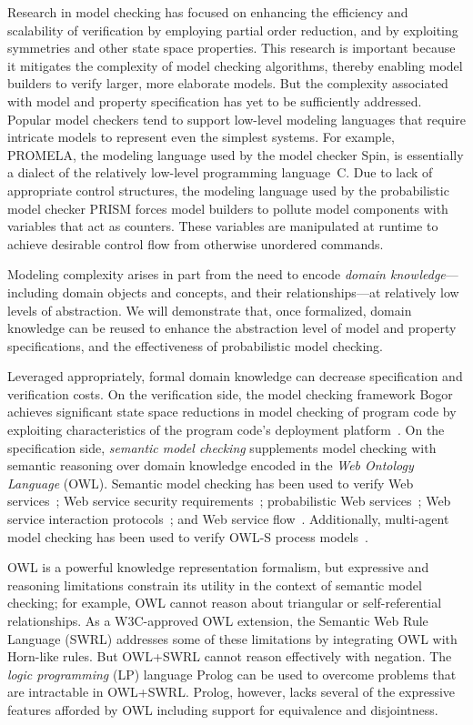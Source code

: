 Research in model checking has focused on enhancing the efficiency and scalability of verification by employing partial order reduction, and by exploiting symmetries and other state space properties. This research is important because it mitigates the complexity of model checking algorithms, thereby enabling model builders to verify larger, more elaborate models. But the complexity associated with model and property specification has yet to be sufficiently addressed. Popular model checkers tend to support low-level modeling languages that require intricate models to represent even the simplest systems. For example, PROMELA, the modeling language used by the model checker Spin, is essentially a dialect of the relatively low-level programming language~C\@. Due to lack of appropriate control structures, the modeling language used by the probabilistic model checker PRISM forces model builders to pollute model components with variables that act as counters. These variables are manipulated at runtime to achieve desirable control flow from otherwise unordered commands.

Modeling complexity arises in part from the need to encode \emph{domain knowledge}---including domain objects and concepts, and their relationships---at relatively low levels of abstraction. We will demonstrate that, once formalized, domain knowledge can be reused to enhance the abstraction level of model and property specifications, and the effectiveness of probabilistic model checking.

Leveraged appropriately, formal domain knowledge can decrease specification and verification costs. On the verification side, the model checking framework Bogor achieves significant state space reductions in model checking of program code by exploiting characteristics of the program code's deployment platform~\cite{Robby_2003}. On the specification side, \emph{semantic model checking} supplements model checking with semantic reasoning over domain knowledge encoded in the \emph{Web Ontology Language} (OWL). Semantic model checking has been used to verify Web services~\cite{Narayanan_2002,Di_Pietro_2012}; Web service security requirements~\cite{Boaro_2010}; probabilistic Web services~\cite{Oghabi_2011}; Web service interaction protocols~\cite{Ankolekar_2005}; and Web service flow~\cite{Liu_2008}. Additionally, multi-agent model checking has been used to verify OWL-S process models~\cite{Lomuscio_2009}.

OWL is a powerful knowledge representation formalism, but expressive and reasoning limitations constrain its utility in the context of semantic model checking; for example, OWL cannot reason about triangular or self-referential relationships. As a W3C-approved OWL extension, the Semantic Web Rule Language (SWRL) addresses some of these limitations by integrating OWL with Horn-like rules. But OWL+SWRL cannot reason effectively with negation. The \emph{logic programming} (LP) language Prolog can be used to overcome problems that are intractable in OWL+SWRL\@. Prolog, however, lacks several of the expressive features afforded by OWL including support for equivalence and disjointness.

